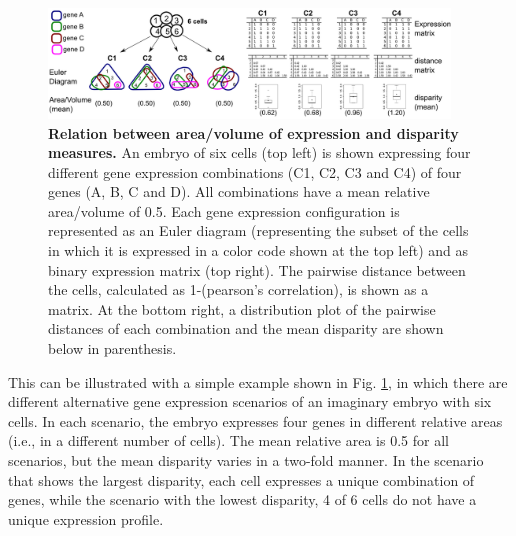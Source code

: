 \begin{figure}[h]
  \includegraphics[width=0.95\textwidth]{./Images/measures_relations.png}
  \centering
  \caption{\textbf{Relation between area/volume of expression and disparity measures.} An embryo of six cells (top left) is shown expressing four different gene expression combinations (C1, C2, C3 and C4) of four genes (A, B, C and D). All combinations have a mean relative area/volume of 0.5. Each gene expression configuration is represented as an Euler diagram (representing the subset of the cells in which it is expressed in a color code shown at the top left) and as binary expression matrix (top right). The pairwise distance between the cells, calculated as 1-(pearson's correlation), is shown as a matrix. At the bottom right, a distribution plot of the pairwise distances of each combination and the mean disparity are shown below in parenthesis.
 }
  \label{fig:measures_relations}
\end{figure}

This can be illustrated with a simple example shown in Fig. \ref{fig:measures_relations}, in which there are different alternative gene expression scenarios of an imaginary embryo with six cells. In each scenario, the embryo expresses four genes in different relative areas (i.e., in a different number of cells). The mean relative area is 0.5 for all scenarios, but the mean disparity varies in a two-fold manner. In the scenario that shows the largest disparity, each cell expresses a unique combination of genes, while the scenario with the lowest disparity, 4 of 6 cells do not have a unique expression profile.

